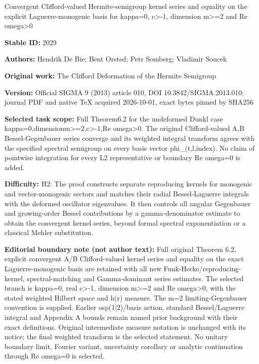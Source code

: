 \documentclass[11pt]{article}
\numberwithin{equation}{section}
\numberwithin{theorem}{section}
\numberwithin{proposition}{section}
\numberwithin{lemma}{section}
\numberwithin{corollary}{section}
\numberwithin{definition}{section}
\numberwithin{example}{section}
\numberwithin{remark}{section}
\numberwithin{note}{section}
\theoremstyle{remark}
\begin{document}
\begin{center}\Large Convergent Clifford-valued Hermite-semigroup kernel series and equality on the explicit Laguerre-monogenic basis for kappa=\allowbreak{}0, c>-1, dimension m>=\allowbreak{}2 and Re omega>0\end{center}
\noindent\textbf{Stable ID:} 2029\par
\noindent\textbf{Authors:} Hendrik De Bie; Bent Orsted; Petr Somberg; Vladimir Soucek\par
\noindent\textbf{Original work:} The Clifford Deformation of the Hermite Semigroup\par
\noindent\textbf{Version:} Official SIGMA 9 (2013) article 010, DOI 10.3842/SIGMA.2013.010; journal PDF and native TeX acquired 2026-10-01, exact bytes pinned by SHA256\par
\noindent\textbf{Selected task scope:} Full Theorem6.2 for the undeformed Dunkl case kappa=\allowbreak{}0,dimensionm>=\allowbreak{}2,c>-1,Re omega>0. The original Clifford-valued A,B Bessel-Gegenbauer series converge and its weighted integral transform agrees with the specified spectral semigroup on every basis vector phi\_(t,l,index). No claim of pointwise integration for every L2 representative or boundary Re omega=\allowbreak{}0 is added.\par
\noindent\textbf{Difficulty:} H2: The proof constructs separate reproducing kernels for monogenic and vector-monogenic sectors and matches their radial Bessel-Laguerre integrals with the deformed oscillator eigenvalues. It then controls all angular Gegenbauer and growing-order Bessel contributions by a gamma-denominator estimate to obtain the convergent kernel series, beyond formal spectral exponentiation or a classical Mehler substitution.\par
\noindent\textbf{Editorial boundary note (not author text):} Full original Theorem 6.2, explicit convergent A/B Clifford-valued kernel series and equality on the exact Laguerre-monogenic basis are retained with all new Funk-Hecke/reproducing-kernel, spectral-matching and Gamma-dominant series estimates. The selected branch is kappa=\allowbreak{}0, real c>-1, dimension m>=\allowbreak{}2 and Re omega>0, with the stated weighted Hilbert space and h(r) measure. The m=\allowbreak{}2 limiting-Gegenbauer convention is supplied. Earlier osp(1|2)/basis action, standard Bessel/Laguerre integral and Appendix A bounds remain named prior background with their exact definitions. Original intermediate measure notation is unchanged with its notice; the final weighted transform is the selected statement. No unitary boundary limit, Fourier variant, uncertainty corollary or analytic continuation through Re omega=\allowbreak{}0 is selected.\par
\end{document}
